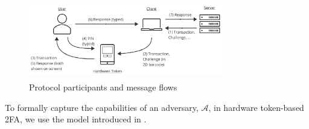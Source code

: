 \begin{figure}
\begin{centering}
\includegraphics[height=3.4cm, width=8.5cm]{setup}
\end{centering}
\caption{\label{fig:setup.}Protocol participants and message flows}
\end{figure}
%




To formally capture the capabilities of an adversary, $\mathcal{A}$, in hardware token-based 2FA,  we use the model introduced in \cite{BellarePR00}. 


